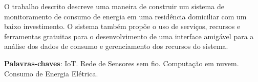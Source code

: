 \setlength{\absparsep}{18pt} %
\begin{resumo}
 O trabalho descrito descreve uma maneira de construir um sistema de monitoramento de consumo de energia em uma residência domiciliar com um baixo investimento. O sistema também propõe o uso de serviços, recursos e ferramentas gratuitas para o desenvolvimento de uma interface amigável para a análise dos dados de consumo e gerenciamento dos recursos do sistema.

 \textbf{Palavras-chaves}: IoT. Rede de Sensores sem fio. Computação em nuvem. Consumo de Energia Elétrica.
\end{resumo}
